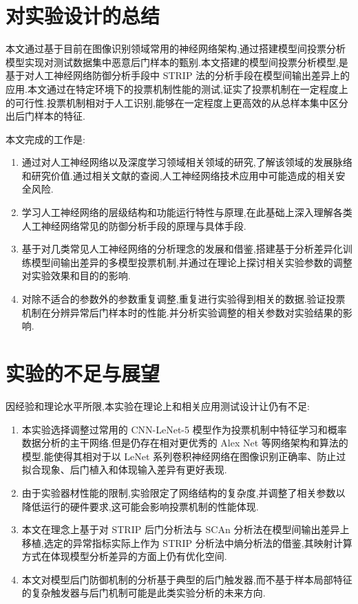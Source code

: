 \section{对实验设计的总结}
本文通过基于目前在图像识别领域常用的神经网络架构,通过搭建模型间投票分析模型实现对测试数据集中恶意后门样本的甄别.本文搭建的模型间投票分析模型,是基于对人工神经网络防御分析手段中 STRIP 法的分析手段在模型间输出差异上的应用.本文通过在特定环境下的投票机制性能的测试,证实了投票机制在一定程度上的可行性.投票机制相对于人工识别,能够在一定程度上更高效的从总样本集中区分出后门样本的特征.

本文完成的工作是:
\begin{enumerate}
	\item 通过对人工神经网络以及深度学习领域相关领域的研究,了解该领域的发展脉络和研究价值.通过相关文献的查阅,人工神经网络技术应用中可能造成的相关安全风险.
	\item 学习人工神经网络的层级结构和功能运行特性与原理,在此基础上深入理解各类人工神经网络常见的防御分析手段的原理与具体手段.
	\item 基于对几类常见人工神经网络的分析理念的发展和借鉴,搭建基于分析差异化训练模型间输出差异的多模型投票机制,并通过在理论上探讨相关实验参数的调整对实验效果和目的的影响.
	\item 对除不适合的参数外的参数重复调整,重复进行实验得到相关的数据.验证投票机制在分辨异常后门样本时的性能.并分析实验调整的相关参数对实验结果的影响.	
\end{enumerate}

\section{实验的不足与展望}

因经验和理论水平所限,本实验在理论上和相关应用测试设计让仍有不足:

\begin{enumerate}
	\item 本实验选择调整过常用的 CNN-LeNet-5 模型作为投票机制中特征学习和概率数据分析的主干网络.但是仍存在相对更优秀的 Alex Net 等网络架构和算法的模型,能使得其相对于以 LeNet 系列卷积神经网络在图像识别正确率、防止过拟合现象\cite{alexnetyoushi}、后门植入和体现输入差异有更好表现.
	\item 由于实验器材性能的限制,实验限定了网络结构的复杂度,并调整了相关参数以降低运行的硬件要求,这可能会影响投票机制的性能体现.
	\item 本文在理念上基于对 STRIP 后门分析法与 SCAn 分析法在模型间输出差异上移植,选定的异常指标实际上作为 STRIP 分析法中熵分析法的借鉴,其映射计算方式在体现模型分析差异的方面上仍有优化空间.
	\item 本文对模型后门防御机制的分析基于典型的后门触发器,而不基于样本局部特征的复杂触发器与后门机制可能是此类实验分析的未来方向.
\end{enumerate}